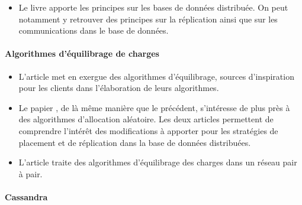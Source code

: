 \documentclass[12pt]{article}
\begin{document}
\begin{itemize}
\item Le livre \cite{Ozsu2011} apporte les principes sur les bases de données distribuée. On peut notamment y retrouver des principes sur la réplication ainsi que sur les communications dans le base de données.

\end{itemize}

\paragraph{Algorithmes d'équilibrage de charges}

\begin{itemize}
\item L'article \cite{BalancedAlloc99} met en exergue des algorithmes d'équilibrage, sources d'inspiration pour les clients dans l'élaboration de leurs algorithmes.

\item Le papier \cite{RandomChoices05}, de là même manière que le précédent, s'intéresse de plus près à des algorithmes d'allocation aléatoire. Les deux articles permettent de comprendre l'intérêt des modifications à apporter pour les stratégies de placement et de réplication dans la base de données distribuées.

\item L'article \cite{LoadBalancingPeertoPeer14} traite des algorithmes d'équilibrage des charges dans un réseau pair à pair.

\end{itemize}

\paragraph{Cassandra}
\end{document}
